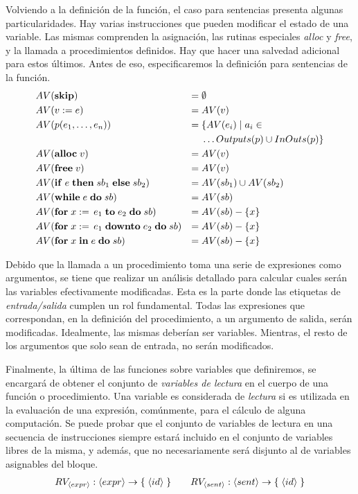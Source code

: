 \documentclass{article}
\begin{document}
Volviendo a la definición de la función, el caso para sentencias presenta algunas particularidades.
Hay varias instrucciones que pueden modificar el estado de una variable.
Las mismas comprenden la asignación, las rutinas especiales \textit{alloc} y \textit{free}, y la llamada a procedimientos definidos.
Hay que hacer una salvedad adicional para estos últimos.
Antes de eso, especificaremos la definición para sentencias de la función.
\begin{align*}
&AV(\mathbf{skip})
&=&\;
\emptyset
\\
&AV(v := e)
&=&\;
AV(v)
\\
&AV(p(e_1, \ldots, e_n))
&=&\;
\{ AV(e_i) \mid a_i \in 
\\
&&&\;
\ldots
Outputs(p) \cup InOuts(p) \}
\\
&AV(\mathbf{alloc} \; v)
&=&\;
AV(v)
\\
&AV(\mathbf{free} \; v)
&=&\;
AV(v)
\\
&AV(\mathbf{if} \; e \; \mathbf{then} \; sb_1 \; \mathbf{else} \; sb_2)
&=&\;
AV(sb_1) \cup AV(sb_2)
\\
&AV(\mathbf{while} \; e \; \mathbf{do} \; sb)
&=&\;
AV(sb)
\\
&AV(\mathbf{for} \; x := \, e_1 \; \mathbf{to} \; e_2 \; \mathbf{do} \; sb)
&=&\;
AV(sb) - \{ x \}
\\
&AV(\mathbf{for} \; x := \, e_1 \; \mathbf{downto} \; e_2 \; \mathbf{do} \; sb)
&=&\;
AV(sb) - \{ x \}
\\
&AV(\mathbf{for} \; x \; \mathbf{in} \; e \; \mathbf{do} \; sb)
&=&\;
AV(sb) - \{ x \}
\end{align*}

Debido que la llamada a un procedimiento toma una serie de expresiones como argumentos, se tiene que realizar un análisis detallado para calcular cuales serán las variables efectivamente modificadas.
Esta es la parte donde las etiquetas de \textit{entrada/salida} cumplen un rol fundamental.
Todas las expresiones que correspondan, en la definición del procedimiento, a un argumento de salida, serán modificadas.
Idealmente, las mismas deberían ser variables.
Mientras, el resto de los argumentos que solo sean de entrada, no serán modificados.

Finalmente, la última de las funciones sobre variables que definiremos, se encargará de obtener el conjunto de \textit{variables de lectura} en el cuerpo de una función o procedimiento.
Una variable es considerada de \textit{lectura} si es utilizada en la evaluación de una expresión, comúnmente, para el cálculo de alguna computación.
Se puede probar que el conjunto de variables de lectura en una secuencia de instrucciones siempre estará incluido en el conjunto de variables libres de la misma, y además, que no necesariamente será disjunto al de variables asignables del bloque.
\begin{gather*}
RV_{\langle expr \rangle}: \langle expr \rangle \rightarrow \{ \; \langle id \rangle \; \}
\qquad
RV_{\langle sent \rangle}: \langle sent \rangle \rightarrow \{ \; \langle id \rangle \; \}
\end{gather*}
\end{document}
